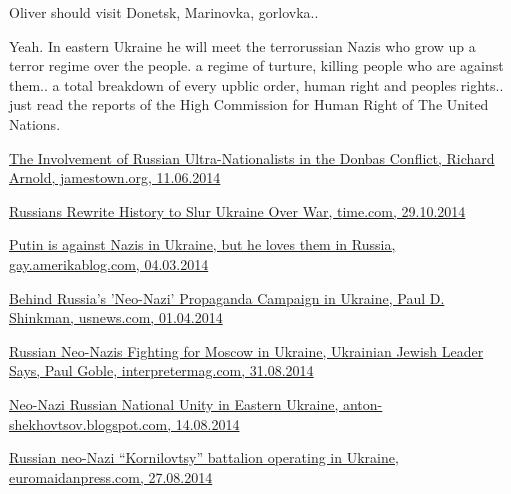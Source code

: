 \begin{itemize}
\begin{itemize}
Oliver should visit Donetsk, Marinovka, gorlovka..


Yeah. In eastern Ukraine he will meet the terrorussian Nazis who grow up a
terror regime over the people. a regime of turture, killing people who are
against them.. a total breakdown of every upblic order, human right and peoples
rights..  just read the reports of the High Commission for Human Right of The
United Nations.

\href{https://jamestown.org/program/the-involvement-of-russian-ultra-nationalists-in-the-donbas-conflict/}{%
The Involvement of Russian Ultra-Nationalists in the Donbas Conflict, %
Richard Arnold, jamestown.org, 11.06.2014%
}


\href{http://time.com/3545855/russia-ukraine-war-history/}{%
Russians Rewrite History to Slur Ukraine Over War, time.com, 29.10.2014%
}


\href{https://gay.americablog.com/2014/03/meet-vladimir-putin-favorite-neo-nazis-russia-crimea.html}{%
Putin is against Nazis in Ukraine, but he loves them in Russia, %
gay.amerikablog.com, 04.03.2014%
}


\href{https://www.usnews.com/news/articles/2014/04/01/behind-russias-neo-nazi-propaganda-campaign-in-ukraine}{%
Behind Russia's 'Neo-Nazi' Propaganda Campaign in Ukraine, Paul D. Shinkman, usnews.com, 01.04.2014%
}


\href{https://www.interpretermag.com/russian-neo-nazis-fighting-for-moscow-in-ukraine-ukrainian-jewish-leader-says/}{%
Russian Neo-Nazis Fighting for Moscow in Ukraine, Ukrainian Jewish Leader Says, %
Paul Goble, interpretermag.com, 31.08.2014%
}


\href{http://anton-shekhovtsov.blogspot.com/2014/08/neo-nazi-russian-national-unity-in.html}{%
Neo-Nazi Russian National Unity in Eastern Ukraine, anton-shekhovtsov.blogspot.com, %
14.08.2014%
}


\href{http://euromaidanpress.com/2014/08/27/russian-neo-nazi-kornilovtsy-battalion-operating-in-ukraine/}{%
Russian neo-Nazi \enquote{Kornilovtsy} battalion operating in Ukraine, euromaidanpress.com, 27.08.2014%
}


\end{itemize}
\end{itemize}

